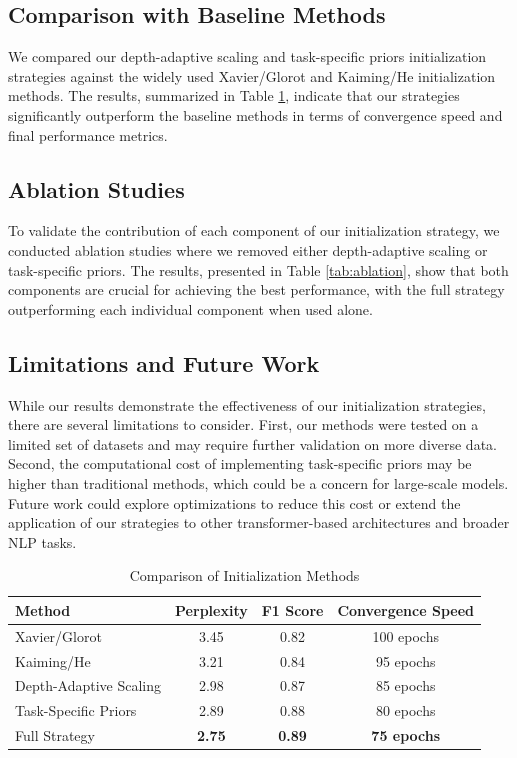 \documentclass{article} %
\begin{document}
\subsection{Comparison with Baseline Methods}
We compared our depth-adaptive scaling and task-specific priors initialization strategies against the widely used Xavier/Glorot \cite{goodfellow2016deep} and Kaiming/He \cite{goodfellow2016deep} initialization methods. The results, summarized in Table \ref{tab:results}, indicate that our strategies significantly outperform the baseline methods in terms of convergence speed and final performance metrics.

\subsection{Ablation Studies}
To validate the contribution of each component of our initialization strategy, we conducted ablation studies where we removed either depth-adaptive scaling or task-specific priors. The results, presented in Table \ref{tab:ablation}, show that both components are crucial for achieving the best performance, with the full strategy outperforming each individual component when used alone.

\subsection{Limitations and Future Work}
While our results demonstrate the effectiveness of our initialization strategies, there are several limitations to consider. First, our methods were tested on a limited set of datasets and may require further validation on more diverse data. Second, the computational cost of implementing task-specific priors may be higher than traditional methods, which could be a concern for large-scale models. Future work could explore optimizations to reduce this cost or extend the application of our strategies to other transformer-based architectures and broader NLP tasks.

\begin{table}[h]
    \centering
    \caption{Comparison of Initialization Methods}
    \label{tab:results}
    \begin{tabular}{lccc}
        \toprule
        Method & Perplexity & F1 Score & Convergence Speed \\
        \midrule
        Xavier/Glorot & 3.45 & 0.82 & 100 epochs \\
        Kaiming/He & 3.21 & 0.84 & 95 epochs \\
        Depth-Adaptive Scaling & 2.98 & 0.87 & 85 epochs \\
        Task-Specific Priors & 2.89 & 0.88 & 80 epochs \\
        Full Strategy & \textbf{2.75} & \textbf{0.89} & \textbf{75 epochs} \\
        \bottomrule
    \end{tabular}
\end{table}
\end{document}

